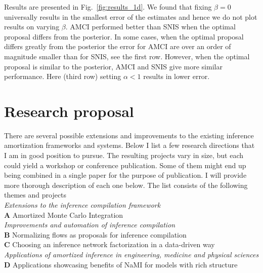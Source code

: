 \documentclass[12pt]{article}
\begin{document}
Results are presented in Fig.~\ref{fig:results_1d}. 
We found that fixing $\beta=0$ universally results in the smallest error of the estimates and hence we do not plot results on varying $\beta$.
AMCI performed better than SNIS when the optimal proposal differs from the posterior.
In some cases, when the optimal proposal differs greatly from the posterior the error for AMCI are over an order of magnitude smaller than for SNIS, see the first row.
However, when the optimal proposal is similar to the posterior, AMCI and SNIS give more similar performance.
Here (third row) setting $\alpha < 1$ results in lower error.




\section{Research proposal}
There are several possible extensions and improvements to the existing inference amortization frameworks and systems. 
Below I list a few research directions that I am in good position to pursue.
The resulting projects vary in size, but each could yield a workshop or conference publication.
Some of them might end up being combined in a single paper for the purpose of publication.
I will provide more thorough description of each one below.
The list consists of the following themes and projects\\
\emph{Extensions to the inference compilation framework}\\
\textbf{A} \quad Amortized Monte Carlo Integration\\
\emph{Improvements and automation of inference compilation}\\
\textbf{B} \quad Normalizing flows as proposals for inference compilation\\
\textbf{C} \quad Choosing an inference network factorization in a data-driven way\\
\emph{Applications of amortized inference in engineering, medicine and physical sciences}\\
\textbf{D} \quad Applications showcasing benefits of NaMI for models with rich structure\\
\end{document}
